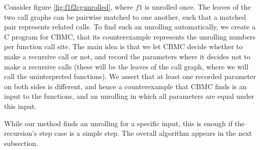 Consider figure \ref{fig:f1f2cgunrolled}, where $f1$ is unrolled once. The leaves of the two call graphs can be pairwise matched to one another, such that a matched pair represents related calls. To find such an unrolling automatically, we create a C program for CBMC, that its counterexample represents the unrolling numbers per function call site. The main idea is that we let CBMC decide whether to make a recursive call or not, and record the parameters where it decides not to make a recursive calls (these will be the leaves of the call graph, where we will call the uninterpreted functions). We assert that at least one recorded parameter on both sides is different, and hence a counterexample that CBMC finds is an input to the functions, and an unrolling in which all parameters are equal under this input. 


While our method finds an unrolling for a specific input, this is enough if the recursion's step case is a simple step.
The overall algorithm appears in the next subsection. 


